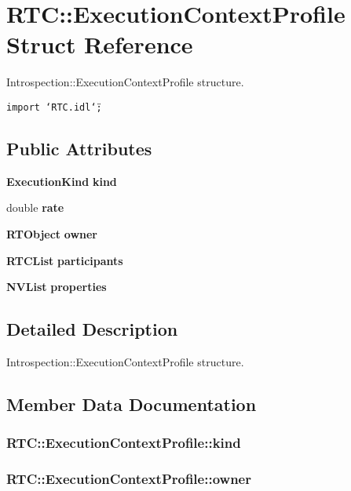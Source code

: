 \section{RTC::Execution\-Context\-Profile Struct Reference}
\label{structRTC_1_1ExecutionContextProfile}
Introspection::Execution\-Context\-Profile structure.  


{\tt import \char`\"{}RTC.idl\char`\"{};}

\subsection*{Public Attributes}
\begin{CompactItemize}
\item 
{\bf Execution\-Kind} {\bf kind}
\item 
double {\bf rate}
\item 
{\bf RTObject} {\bf owner}
\item 
{\bf RTCList} {\bf participants}
\item 
{\bf NVList} {\bf properties}
\end{CompactItemize}


\subsection{Detailed Description}
Introspection::Execution\-Context\-Profile structure. 



\subsection{Member Data Documentation}
\subsubsection{ {\bf RTC::Execution\-Context\-Profile::kind}}\label{structRTC_1_1ExecutionContextProfile_RTC_1_1ExecutionContextProfileo0}


\subsubsection{ {\bf RTC::Execution\-Context\-Profile::owner}}\label{structRTC_1_1ExecutionContextProfile_RTC_1_1ExecutionContextProfileo2}


